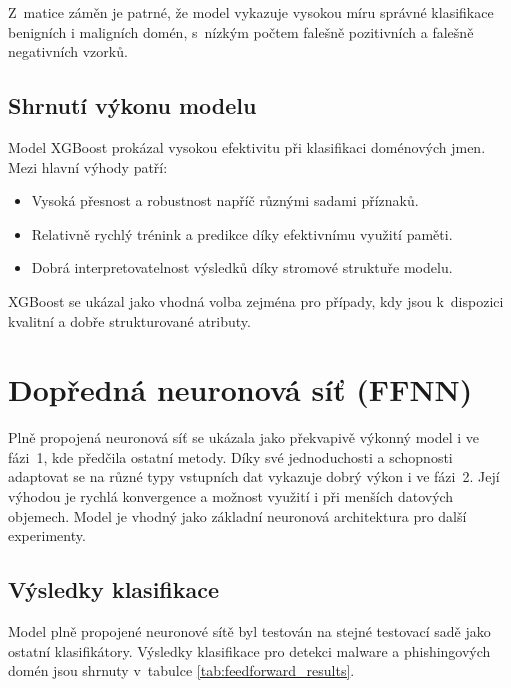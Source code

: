 Z~matice záměn je patrné, že model vykazuje vysokou míru správné klasifikace benigních i maligních domén, s~nízkým počtem falešně pozitivních a falešně negativních vzorků.

\subsection{Shrnutí výkonu modelu}

Model XGBoost prokázal vysokou efektivitu při klasifikaci doménových jmen. Mezi hlavní výhody patří:
\begin{itemize}
    \item Vysoká přesnost a robustnost napříč různými sadami příznaků.
    \item Relativně rychlý trénink a predikce díky efektivnímu využití paměti.
    \item Dobrá interpretovatelnost výsledků díky stromové struktuře modelu.
\end{itemize}

XGBoost se ukázal jako vhodná volba zejména pro případy, kdy jsou k~dispozici kvalitní a dobře strukturované atributy.





\section{Dopředná neuronová síť (FFNN)}\label{res:feedforward}
Plně propojená neuronová síť se ukázala jako překvapivě výkonný model i ve fázi~1, kde předčila ostatní metody. Díky své jednoduchosti a schopnosti adaptovat se na různé typy vstupních dat vykazuje dobrý výkon i ve fázi~2. Její výhodou je rychlá konvergence a možnost využití i při menších datových objemech. Model je vhodný jako základní neuronová architektura pro další experimenty.


\subsection{Výsledky klasifikace}

Model plně propojené neuronové sítě byl testován na stejné testovací sadě jako ostatní klasifikátory. Výsledky klasifikace pro detekci malware a phishingových domén jsou shrnuty v~tabulce \ref{tab:feedforward_results}.


